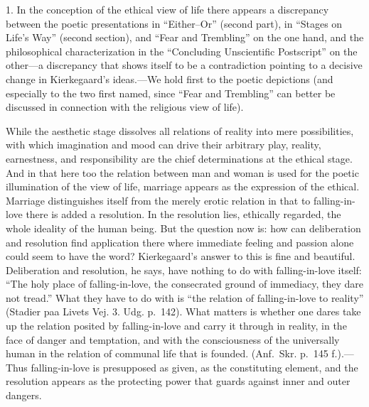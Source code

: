\documentclass[12pt,a4paper]{book}
\newcommand{\opage}[1]{\marginnote{\footnotesize\textit{[#1]}}}
\begin{document}
1. In the conception of the ethical view of life there appears a
discrepancy between the poetic presentations in ``Either--Or'' (second
part), in ``Stages on Life's Way'' (second section), and ``Fear and
Trembling'' on the one hand, and the philosophical characterization in the
``Concluding Unscientific Postscript'' on the other---a discrepancy that
shows itself to be a contradiction pointing to a decisive change in
Kierkegaard's ideas.---We hold first to the poetic depictions (and
especially to the two first named, since ``Fear and Trembling'' can better
be discussed in connection with the religious view of life).

While the aesthetic stage dissolves all relations of reality into mere
possibilities, with which imagination and mood can drive their arbitrary
play, reality, earnestness, and responsibility are the chief determinations
at the ethical stage. And in that here too the relation between man and
woman is used for the poetic illumination of the view of life, marriage
appears as the expression of the ethical. Marriage distinguishes itself
from the merely erotic relation in that to falling-in-love there is added
a resolution. In the resolution lies, ethically regarded, the whole
ideality of the human being. But the question now is: how can deliberation
and resolution find application there where immediate feeling and passion
alone could seem to have the word? Kierkegaard's answer to this is fine
and beautiful. Deliberation and resolution, he says, have nothing to do
with falling-in-love itself: ``The holy place of falling-in-love, the
consecrated ground of immediacy, they dare not tread.'' What they have to
do with is ``the relation of falling-in-love to reality''
(Stadier paa Livets Vej. 3. Udg. p.~142). What matters is whether one
dares take up the relation posited by falling-in-love and carry it through
in reality, in the face of danger
\opage{93}and temptation, and with the consciousness of the universally
human in the relation of communal life that is founded.
(Anf.\ Skr. p.~145 f.).---Thus falling-in-love is presupposed as given, as
the constituting element, and the resolution appears as the protecting
power that guards against inner and outer dangers.
\end{document}
